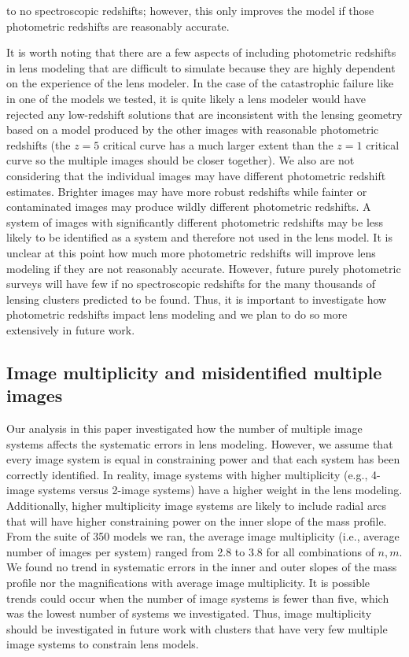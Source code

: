 to no spectroscopic redshifts; however, this only improves the model if those photometric redshifts are reasonably accurate.

It is worth noting that there are a few aspects of including photometric redshifts in lens modeling that are difficult to simulate because they are highly dependent on the experience of the lens modeler. In the case of the catastrophic failure like in one of the models we tested, it is quite likely a lens modeler would have rejected any low-redshift solutions that are inconsistent with the lensing geometry based on a model produced by the other images with reasonable photometric redshifts (the $z=5$ critical curve has a much larger extent than the $z=1$ critical curve so the multiple images should be closer together). We also are not considering that the individual images may have different photometric redshift estimates. Brighter images may have more robust redshifts while fainter or contaminated images may produce wildly different photometric redshifts. A system of images with significantly different photometric redshifts may be less likely to be identified as a system and therefore not used in the lens model. It is unclear at this point how much more photometric redshifts will improve lens modeling if they are not reasonably accurate. However, future purely photometric surveys will have few if no spectroscopic redshifts for the many thousands of lensing clusters predicted to be found. Thus, it is important to investigate how photometric redshifts impact lens modeling and we plan to do so more extensively in future work.

\subsection{Image multiplicity and misidentified multiple images}
Our analysis in this paper investigated how the number of multiple image systems affects the systematic errors in lens modeling. However, we assume that every image system is equal in constraining power and that each system has been correctly identified. In reality, image systems with higher multiplicity (e.g., 4-image systems versus 2-image systems) have a higher weight in the lens modeling. Additionally, higher multiplicity image systems are likely to include radial arcs that will have higher constraining power on the inner slope of the mass profile. From the suite of 350 models we ran, the average image multiplicity (i.e., average number of images per system) ranged from 2.8 to 3.8 for all combinations of $n,m$. We found no trend in systematic errors in the inner and outer slopes of the mass profile nor the magnifications with average image multiplicity. It is possible trends could occur when the number of image systems is fewer than five, which was the lowest number of systems we investigated. Thus, image multiplicity should be investigated in future work with clusters that have very few multiple image systems to constrain lens models.

